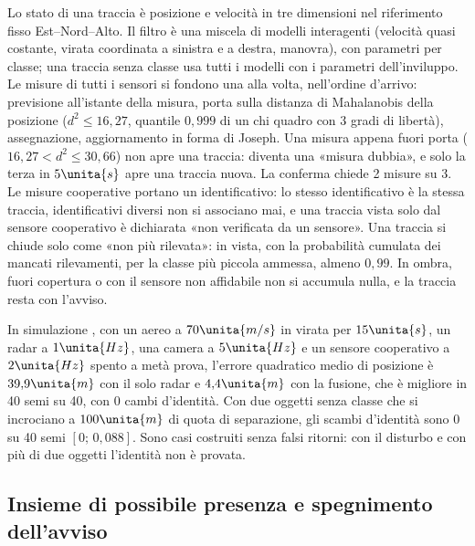 Lo stato di una traccia è posizione e velocità in tre dimensioni nel riferimento fisso Est--Nord--Alto. Il filtro è una miscela di modelli interagenti \cite{barshalom2001} (velocità quasi costante, virata coordinata a sinistra e a destra, manovra), con parametri per classe; una traccia senza classe usa tutti i modelli con i parametri dell'inviluppo. Le misure di tutti i sensori si fondono una alla volta, nell'ordine d'arrivo: previsione all'istante della misura, porta sulla distanza di Mahalanobis della posizione ($d^2\le16{,}27$, quantile $0{,}999$ di un chi quadro con 3 gradi di libertà), assegnazione, aggiornamento in forma di Joseph. Una misura appena fuori porta ($16{,}27<d^2\le30{,}66$) non apre una traccia: diventa una «misura dubbia», e solo la terza in $5\unita{s}$ apre una traccia nuova. La conferma chiede 2 misure su 3. Le misure cooperative portano un identificativo: lo stesso identificativo è la stessa traccia, identificativi diversi non si associano mai, e una traccia vista solo dal sensore cooperativo è dichiarata «non verificata da un sensore». Una traccia si chiude solo come «non più rilevata»: in vista, con la probabilità cumulata dei mancati rilevamenti, per la classe più piccola ammessa, almeno $0{,}99$. In ombra, fuori copertura o con il sensore non affidabile non si accumula nulla, e la traccia resta con l'avviso.

In simulazione , con un aereo a $70\unita{m/s}$ in virata per $15\unita{s}$, un radar a $1\unita{Hz}$, una camera a $5\unita{Hz}$ e un sensore cooperativo a $2\unita{Hz}$ spento a metà prova, l'errore quadratico medio di posizione è $39{,}9\unita{m}$ con il solo radar e $4{,}4\unita{m}$ con la fusione, che è migliore in 40 semi su 40, con 0 cambi d'identità. Con due oggetti senza classe che si incrociano a $100\unita{m}$ di quota di separazione, gli scambi d'identità sono 0 su 40 semi $[0;\,0{,}088]$. Sono casi costruiti senza falsi ritorni: con il disturbo e con più di due oggetti l'identità non è provata.

\subsection{Insieme di possibile presenza e spegnimento dell'avviso}\label{sec:lp-presenza}

